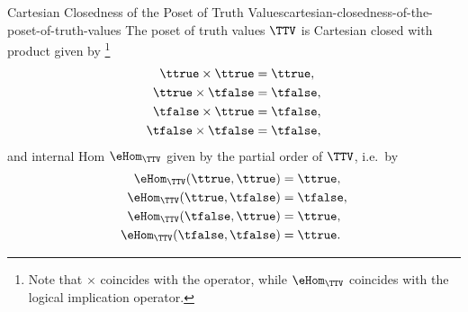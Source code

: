\begin{proposition}{Cartesian Closedness of the Poset of Truth Values}{cartesian-closedness-of-the-poset-of-truth-values}%
    The poset of truth values $\TTV$ is Cartesian closed with product given by%
    \footnote{%
        Note that $\times$ coincides with the  operator, while $\eHom_{\TTV}$ coincides with the logical implication operator.
        \par\vspace*{\TCBBoxCorrection}
    }%
    \begin{align*}
        \ttrue  \times \ttrue  &= \ttrue,\\
        \ttrue  \times \tfalse &= \tfalse,\\
        \tfalse \times \ttrue  &= \tfalse,\\
        \tfalse \times \tfalse &= \tfalse,
    \end{align*}
    and internal Hom $\eHom_{\TTV}$ given by the partial order of $\TTV$, i.e.\ by
    \begin{align*}
        \eHom_{\TTV}(\ttrue,\ttrue)   &= \ttrue,\\
        \eHom_{\TTV}(\ttrue,\tfalse)  &= \tfalse,\\
        \eHom_{\TTV}(\tfalse,\ttrue)  &= \ttrue,\\
        \eHom_{\TTV}(\tfalse,\tfalse) &= \ttrue.
    \end{align*}
\end{proposition}
